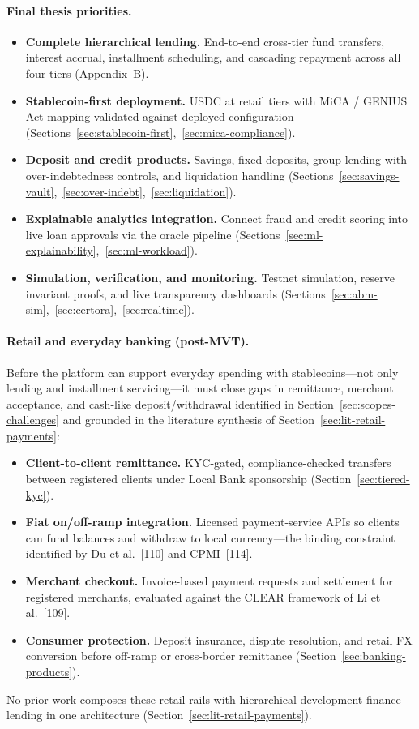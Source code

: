 \documentclass[12pt, a4paper]{report}
\begin{document}
\paragraph{Final thesis priorities.}
\begin{itemize}[noitemsep]
\item \textbf{Complete hierarchical lending.} End-to-end cross-tier fund transfers, interest accrual, installment scheduling, and cascading repayment across all four tiers (Appendix~B).
\item \textbf{Stablecoin-first deployment.} USDC at retail tiers with MiCA / GENIUS Act mapping validated against deployed configuration (Sections~\ref{sec:stablecoin-first},~\ref{sec:mica-compliance}).
\item \textbf{Deposit and credit products.} Savings, fixed deposits, group lending with over-indebtedness controls, and liquidation handling (Sections~\ref{sec:savings-vault},~\ref{sec:over-indebt},~\ref{sec:liquidation}).
\item \textbf{Explainable analytics integration.} Connect fraud and credit scoring into live loan approvals via the oracle pipeline (Sections~\ref{sec:ml-explainability},~\ref{sec:ml-workload}).
\item \textbf{Simulation, verification, and monitoring.} Testnet simulation, reserve invariant proofs, and live transparency dashboards (Sections~\ref{sec:abm-sim},~\ref{sec:certora},~\ref{sec:realtime}).
\end{itemize}

\paragraph{Retail and everyday banking (post-MVT).}
\label{sec:future-retail-payments}

Before the platform can support everyday spending with stablecoins---not only lending and installment servicing---it must close gaps in remittance, merchant acceptance, and cash-like deposit/withdrawal identified in Section~\ref{sec:scopes-challenges} and grounded in the literature synthesis of Section~\ref{sec:lit-retail-payments}:
\begin{itemize}[noitemsep]
\item \textbf{Client-to-client remittance.} KYC-gated, compliance-checked transfers between registered clients under Local Bank sponsorship (Section~\ref{sec:tiered-kyc}).
\item \textbf{Fiat on/off-ramp integration.} Licensed payment-service APIs so clients can fund balances and withdraw to local currency---the binding constraint identified by Du et al.~[110] and CPMI~[114].
\item \textbf{Merchant checkout.} Invoice-based payment requests and settlement for registered merchants, evaluated against the CLEAR framework of Li et al.~[109].
\item \textbf{Consumer protection.} Deposit insurance, dispute resolution, and retail FX conversion before off-ramp or cross-border remittance (Section~\ref{sec:banking-products}).
\end{itemize}
No prior work composes these retail rails with hierarchical development-finance lending in one architecture (Section~\ref{sec:lit-retail-payments}).
\end{document}
